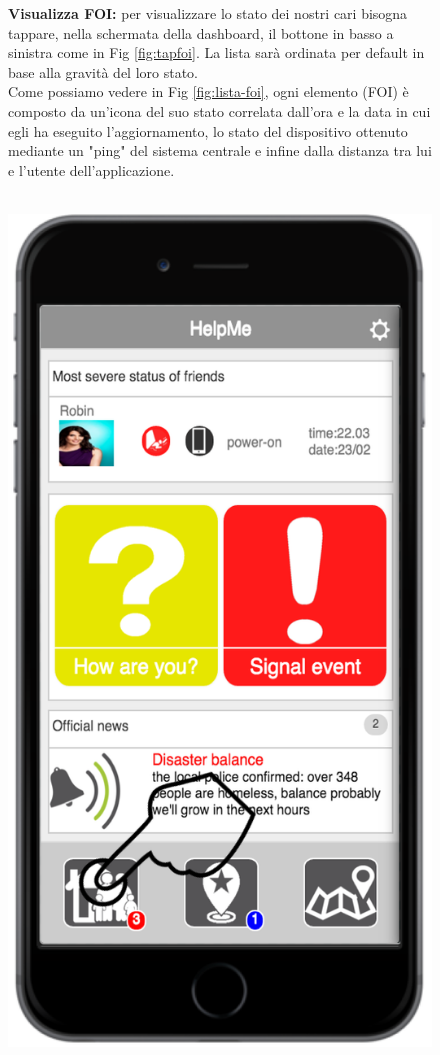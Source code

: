  \begin{figure}
\textbf{Visualizza FOI:} per visualizzare lo stato dei nostri cari bisogna tappare, nella schermata della dashboard, il bottone in basso a sinistra come in Fig \ref{fig:tapfoi}. La lista sarà ordinata per default in base alla gravità del loro stato. \\
 Come possiamo vedere in Fig \ref{fig:lista-foi}, ogni elemento (FOI) è composto da un'icona del suo stato correlata dall'ora e la data in cui egli ha eseguito l'aggiornamento, lo stato del dispositivo ottenuto mediante un "ping" del sistema centrale e infine dalla distanza tra lui e l'utente dell'applicazione.
 \\ \\
 \begin{minipage}[b]{6cm}
   \centering
	\includegraphics[scale=0.6]{interfaccia/tapfoi.png}

\end{minipage}
\end{figure}
